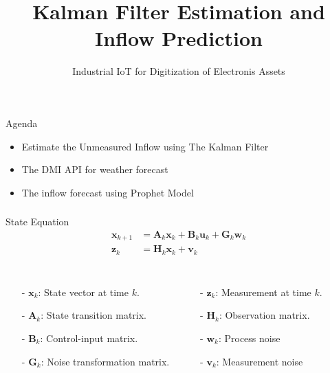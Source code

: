\documentclass[aspectratio=169,hyperref={pdfpagelabels=false}]{beamer}
\subtitle{\normalsize{Industrial IoT for Digitization of Electronis Assets}}
\title{Kalman Filter Estimation and Inflow Prediction}
\begin{document}
\inserttitlepage

\begin{frame}{Agenda}
  \begin{itemize}
    \item Estimate the Unmeasured Inflow using The Kalman Filter 
    \item The DMI API for weather forecast 
    \item The inflow forecast using Prophet Model 
  \end{itemize}
\end{frame}

\begin{frame}
  \frametitle{}
      \begin{block}{State Equation}
        \begin{align*}
          \mathbf{x}_{k+1} &= \mathbf{A}_k \mathbf{x}_k + \mathbf{B}_k \mathbf{u}_k + \mathbf{G}_k \mathbf{w}_k \\
          \mathbf{z}_k &= \mathbf{H}_k \mathbf{x}_k + \mathbf{v}_k 
      \end{align*}
        \end{block}
        \begin{columns}
          \begin{itemize}
              \item[-] \(\mathbf{x}_k\): State vector at time \(k\).
              \item[-] \(\mathbf{A}_k\): State transition matrix.
              \item[-] \(\mathbf{B}_k\): Control-input matrix.
              \item[-] \(\mathbf{G}_k\): Noise transformation matrix.
              
          \end{itemize}
          
          \begin{itemize}
            \item[-] \(\mathbf{z}_k\): Measurement at time \(k\).
            \item[-] \(\mathbf{H}_k\): Observation matrix.
            \item[-]  \(\mathbf{w}_k\): Process noise
            \item[-] \(\mathbf{v}_k\): Measurement noise
        \end{itemize}
          \end{columns}


        \end{frame}
\end{document}
